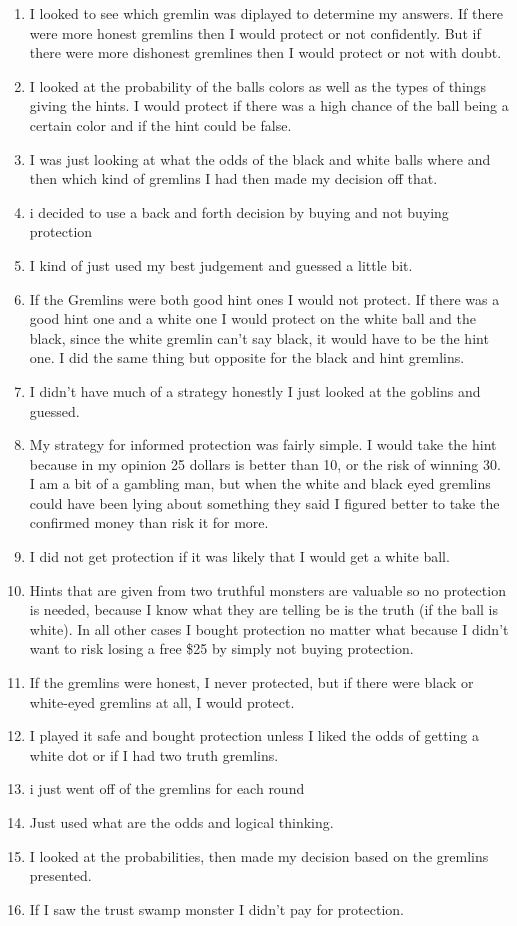\documentclass[12pt,a4paper]{article}
\begin{document}
\begin{appendices}
\begin{enumerate}
\item I looked to see which gremlin was diplayed to determine my answers. If there were more honest gremlins then I would protect or not confidently. But if there were more dishonest gremlines then I would protect or not with doubt.
\item I looked at the probability of the balls colors as well as the types of things giving the hints. I would protect if there was a high chance of the ball being a certain color and if the hint could be false. 
\item I was just looking at what the odds of the black and white balls where and then which kind of gremlins I had then made my decision off that.
\item i decided to use a back and forth decision by buying and not buying protection
\item I kind of just used my best judgement and guessed a little bit.
\item If the Gremlins were both good hint ones I would not protect. If there was a good hint one and a white one I would protect on the white ball and the black, since the white gremlin can't say black, it would have to be the hint one. I did the same thing but opposite for the black and hint gremlins. 
\item I didn't have much of a strategy honestly I just looked at the goblins and guessed. 
\item My strategy for informed protection was fairly simple. I would take the hint because in my opinion 25 dollars is better than 10, or the risk of winning 30. I am a bit of a gambling man, but when the white and black eyed gremlins could have been lying about something they said I figured better to take the confirmed money than risk it for more. 
\item I did not get protection if it was likely that I would get a white ball.
\item Hints that are given from two truthful monsters are valuable so no protection is needed, because I know what they are telling be is the truth (if the ball is white). In all other cases I bought protection no matter what because I didn't want to risk losing a free \$25 by simply not buying protection.
\item If the gremlins were honest, I never protected, but if there were black or white-eyed gremlins at all, I would protect.
\item I played it safe and bought protection unless I liked the odds of getting a white dot or if I had two truth gremlins.
\item i just went off of the gremlins for each round
\item Just used what are the odds and logical thinking.
\item I looked at the probabilities, then made my decision based on the gremlins presented.
\item If I saw the trust swamp monster I didn't pay for protection.



\end{enumerate}
\end{appendices}
\end{document}
